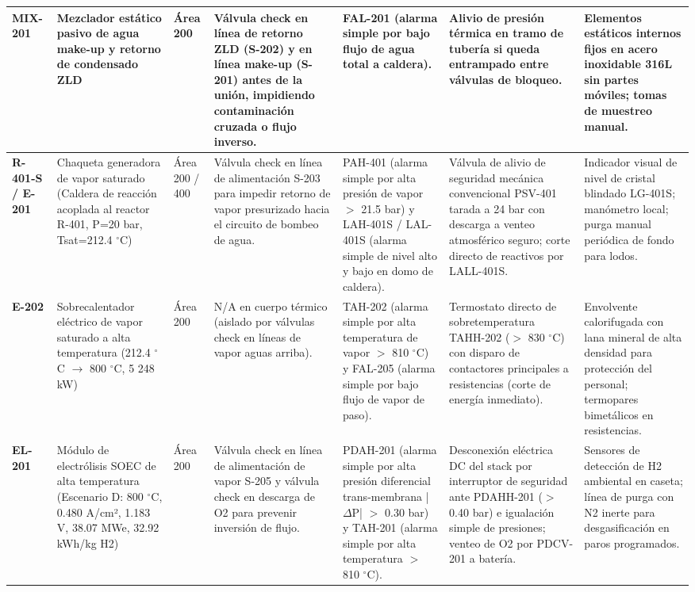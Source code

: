 \documentclass[10pt,letterpaper]{article}
\begin{document}
\begin{landscape}
\begin{xltabular}{\linewidth}{|l|p{2.8cm}|p{1.2cm}|>{\raggedright\arraybackslash}X|>{\raggedright\arraybackslash}X|>{\raggedright\arraybackslash}X|p{2.8cm}|}
\textbf{MIX-201} & Mezclador estático pasivo de agua make-up y retorno de condensado ZLD & Área 200 & Válvula check en línea de retorno ZLD (S-202) y en línea make-up (S-201) antes de la unión, impidiendo contaminación cruzada o flujo inverso. & FAL-201 (alarma simple por bajo flujo de agua total a caldera). & Alivio de presión térmica en tramo de tubería si queda entrampado entre válvulas de bloqueo. & Elementos estáticos internos fijos en acero inoxidable 316L sin partes móviles; tomas de muestreo manual. \\ \hline
\textbf{R-401-S / E-201} & Chaqueta generadora de vapor saturado (Caldera de reacción acoplada al reactor R-401, P=20 bar, Tsat=212.4 $^\circ$C) & Área 200 / 400 & Válvula check en línea de alimentación S-203 para impedir retorno de vapor presurizado hacia el circuito de bombeo de agua. & PAH-401 (alarma simple por alta presión de vapor $>$ 21.5 bar) y LAH-401S / LAL-401S (alarma simple de nivel alto y bajo en domo de caldera). & Válvula de alivio de seguridad mecánica convencional PSV-401 tarada a 24 bar con descarga a venteo atmosférico seguro; corte directo de reactivos por LALL-401S. & Indicador visual de nivel de cristal blindado LG-401S; manómetro local; purga manual periódica de fondo para lodos. \\ \hline
\textbf{E-202} & Sobrecalentador eléctrico de vapor saturado a alta temperatura (212.4 $^\circ$C $\to$ 800 $^\circ$C, 5 248 kW) & Área 200 & N/A en cuerpo térmico (aislado por válvulas check en líneas de vapor aguas arriba). & TAH-202 (alarma simple por alta temperatura de vapor $>$ 810 $^\circ$C) y FAL-205 (alarma simple por bajo flujo de vapor de paso). & Termostato directo de sobretemperatura TAHH-202 ($>$ 830 $^\circ$C) con disparo de contactores principales a resistencias (corte de energía inmediato). & Envolvente calorifugada con lana mineral de alta densidad para protección del personal; termopares bimetálicos en resistencias. \\ \hline
\textbf{EL-201} & Módulo de electrólisis SOEC de alta temperatura (Escenario D: 800 $^\circ$C, 0.480 A/cm², 1.183 V, 38.07 MWe, 32.92 kWh/kg H2) & Área 200 & Válvula check en línea de alimentación de vapor S-205 y válvula check en descarga de O2 para prevenir inversión de flujo. & PDAH-201 (alarma simple por alta presión diferencial trans-membrana |$\Delta$P| $>$ 0.30 bar) y TAH-201 (alarma simple por alta temperatura $>$ 810 $^\circ$C). & Desconexión eléctrica DC del stack por interruptor de seguridad ante PDAHH-201 ($>$ 0.40 bar) e igualación simple de presiones; venteo de O2 por PDCV-201 a batería. & Sensores de detección de H2 ambiental en caseta; línea de purga con N2 inerte para desgasificación en paros programados. \\ \hline

\end{xltabular}
\end{landscape}
\end{document}
